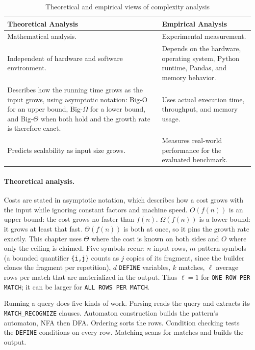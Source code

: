\begin{table}[H]
\centering
\caption{Theoretical and empirical views of complexity analysis}
\label{tab:complexity_analysis}
\begin{tabularx}{\textwidth}{
  >{\raggedright\arraybackslash}p{}
  >{\raggedright\arraybackslash}X}
\toprule
\textbf{Theoretical Analysis} & \textbf{Empirical Analysis} \\
\midrule
Mathematical analysis. &
Experimental measurement. \\
\midrule
Independent of hardware and software environment. &
Depends on the hardware, operating system, Python runtime,
Pandas, and memory behavior. \\
\midrule
Describes how the running time grows as the input grows, using
asymptotic notation: Big-O for an upper bound, Big-$\Omega$ for a
lower bound, and Big-$\Theta$ when both hold and the growth rate is
therefore exact. &
Uses actual execution time, throughput, and memory usage. \\
\midrule
Predicts scalability as input size grows. &
Measures real-world performance for the evaluated benchmark. \\
\bottomrule
\end{tabularx}
\end{table}

\paragraph{Theoretical analysis.}
Costs are stated in asymptotic notation, which describes how a cost
grows with the input while ignoring constant factors and machine speed.
$O(f(n))$ is an upper bound: the cost grows no faster than $f(n)$.
$\Omega(f(n))$ is a lower bound: it grows at least that fast.
$\Theta(f(n))$ is both at once, so it pins the growth rate exactly.
This chapter uses $\Theta$ where the cost is known on both sides and
$O$ where only the ceiling is claimed.
Five symbols recur: $n$ input rows, $m$ pattern symbols (a bounded
quantifier \texttt{\{i,j\}} counts as $j$ copies of its fragment,
since the builder clones the fragment per repetition), $d$
\texttt{DEFINE} variables, $k$ matches, $\ell$ average rows per
match that are materialized in the output.  Thus $\ell=1$ for
\texttt{ONE ROW PER MATCH}; it can be larger for
\texttt{ALL ROWS PER MATCH}.

Running a query does five kinds of work.  Parsing reads the query and
extracts its \texttt{MATCH\_\allowbreak{}RECOGNIZE} clauses.  Automaton
construction builds the pattern's automaton, NFA then DFA.  Ordering
sorts the rows.  Condition checking tests the \texttt{DEFINE}
conditions on every row.  Matching scans for matches and builds the
output.


